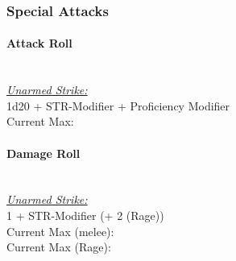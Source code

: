 \documentclass[letterpaper,openany,oneside,twocolumn]{book}
\begin{document}
\subsubsection*{Special Attacks}
\paragraph*{Attack Roll}\hfill\\
\underline{\textit{Unarmed Strike:}}\\
1d20 + STR-Modifier + Proficiency Modifier\\
\indent Current Max: 
\paragraph*{Damage Roll}\hfill\\
\underline{\textit{Unarmed Strike:}}\\
1 + STR-Modifier (+ 2 (Rage))\\
\indent Current Max (melee): \\
\indent Current Max (Rage): 
\end{document}
